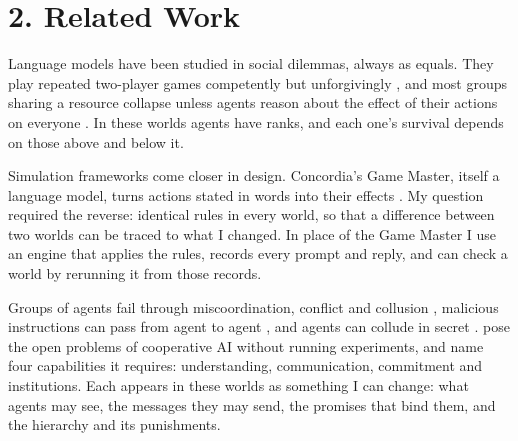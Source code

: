 \section*{2. Related Work}
Language models have been studied in social dilemmas, always as equals. They play repeated two-player games competently but unforgivingly \citep{akata2025repeated}, and most groups sharing a resource collapse unless agents reason about the effect of their actions on everyone \citep{piatti2024govsim}. In these worlds agents have ranks, and each one's survival depends on those above and below it.

Simulation frameworks come closer in design. Concordia's Game Master, itself a language model, turns actions stated in words into their effects \citep{vezhnevets2023concordia}. My question required the reverse: identical rules in every world, so that a difference between two worlds can be traced to what I changed. In place of the Game Master I use an engine that applies the rules, records every prompt and reply, and can check a world by rerunning it from those records.

Groups of agents fail through miscoordination, conflict and collusion \citep{hammond2025risks}, malicious instructions can pass from agent to agent \citep{lee2024infection}, and agents can collude in secret \citep{motwani2024collusion}. \citet{dafoe2020open} pose the open problems of cooperative AI without running experiments, and name four capabilities it requires: understanding, communication, commitment and institutions. Each appears in these worlds as something I can change: what agents may see, the messages they may send, the promises that bind them, and the hierarchy and its punishments.
